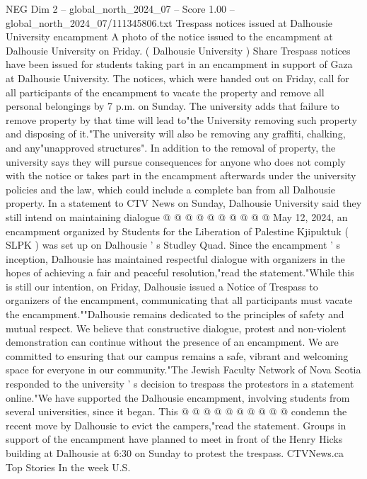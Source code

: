 \begin{textsample}{NEG Dim 2 – global\_north\_2024\_07 – Score 1.00 – global\_north\_2024\_07/111345806.txt}  \label{ex:f2_neg_258}
Trespass notices issued at Dalhousie University encampment A photo of the notice issued to the encampment at Dalhousie University on Friday. ( Dalhousie University ) Share Trespass notices have been issued for students taking part in an encampment in support of Gaza at Dalhousie University.
The notices, which were handed out on Friday, call for all participants of the encampment to vacate the property and remove all personal belongings by 7 p.m. on Sunday.
The university adds that failure to remove property by that time will lead to"the University removing such property and disposing of it."The university will also be removing any graffiti, chalking, and any"unapproved structures".
In addition to the removal of property, the university says they will pursue consequences for anyone who does not comply with the notice or takes part in the encampment afterwards under the university policies and the law, which could include a complete ban from all Dalhousie property.
In a statement to CTV News on Sunday, Dalhousie University said they still intend on maintaining dialogue @ @ @ @ @ @ @ @ @ @ May 12, 2024, an encampment organized by Students for the Liberation of Palestine Kjipuktuk ( SLPK ) was set up on Dalhousie ' s Studley Quad.
Since the encampment ' s inception, Dalhousie has maintained respectful dialogue with organizers in the hopes of achieving a fair and peaceful resolution,"read the statement."While this is still our intention, on Friday, Dalhousie issued a Notice of Trespass to organizers of the encampment, communicating that all participants must vacate the encampment.""Dalhousie remains dedicated to the principles of safety and mutual respect.
We believe that constructive dialogue, protest and non-violent demonstration can continue without the presence of an encampment.
We are committed to ensuring that our campus remains a safe, vibrant and welcoming space for everyone in our community."The Jewish Faculty Network of Nova Scotia responded to the university ' s decision to trespass the protestors in a statement online."We have supported the Dalhousie encampment, involving students from several universities, since it began.
This @ @ @ @ @ @ @ @ @ @ condemn the recent move by Dalhousie to evict the campers,"read the statement.
Groups in support of the encampment have planned to meet in front of the Henry Hicks building at Dalhousie at 6:30 on Sunday to protest the trespass.
CTVNews.ca Top Stories In the week U.S.

\end{textsample}
